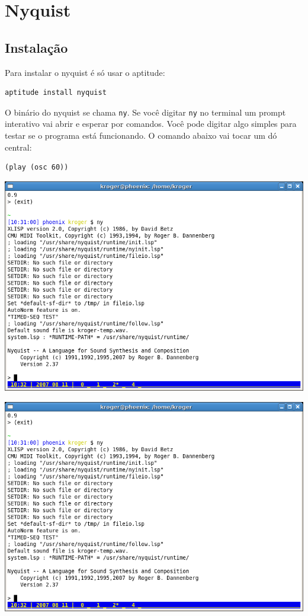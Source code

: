 \documentclass[12pt,brazil]{book}
\begin{document}
\chapter{Nyquist}
\label{cha:nyquist}

\section{Instalação}
\label{sec:instalacao-1}

Para instalar o nyquist é só usar o aptitude:

\begin{verbatim}
aptitude install nyquist
\end{verbatim}

O binário do nyquist se chama \texttt{ny}. Se você digitar \texttt{ny}
no terminal um prompt interativo vai abrir e esperar por comandos.
Você pode digitar algo simples para testar se o programa está
funcionando. O comando abaixo vai tocar um dó central:

\begin{verbatim}
(play (osc 60))
\end{verbatim}

\begin{htmlonly}
  \includegraphics{ny1}
\end{htmlonly}

\begin{latexonly}
  \includegraphics[scale=.5]{ny1}
\end{latexonly}
\end{document}
